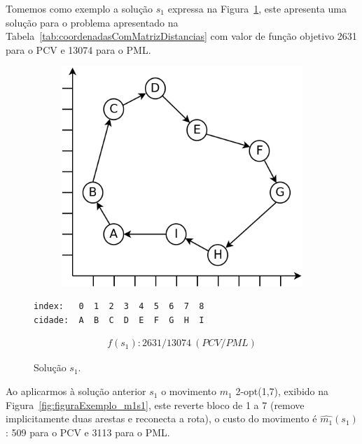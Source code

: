 Tomemos como exemplo a solução $s_1$ expressa na Figura~\ref{fig:figuraExemplo_s1}, este apresenta uma solução para o problema apresentado na Tabela~\ref{tab:coordenadasComMatrizDistancias} com valor de função objetivo 2631 para o PCV e 13074 para o PML.

\begin{figure}[ht]
    \begin{minipage}{.475\textwidth}
        \begin{subfigure}[t]{1\textwidth} %
            \includegraphics[width=1\linewidth]{figuras/pml/exemplo-rodolfo-opt.png}
        \end{subfigure}
    \end{minipage}
    \begin{minipage}{.475\textwidth}
\begin{Verbatim}[commandchars=\\\{\}]
index:   0  1  2  3  4  5  6  7  8
cidade:  A  B  C  D  E  F  G  H  I
\end{Verbatim}
\begin{gather*}
    f(s_1): 2631/13074 \ (PCV/PML)
\end{gather*}
    \end{minipage}
    \caption{Solução $s_1$.}
    \label{fig:figuraExemplo_s1}
\end{figure}

Ao aplicarmos à solução anterior $s_1$ o movimento $m_1$ 2-opt(1,7), exibido na Figura~\ref{fig:figuraExemplo_m1s1}, este reverte bloco de 1 a 7 (remove implicitamente duas arestas e reconecta a rota), o custo do movimento é $\widehat{m_1}(s_1)$: 509 para o PCV e 3113 para o PML.

